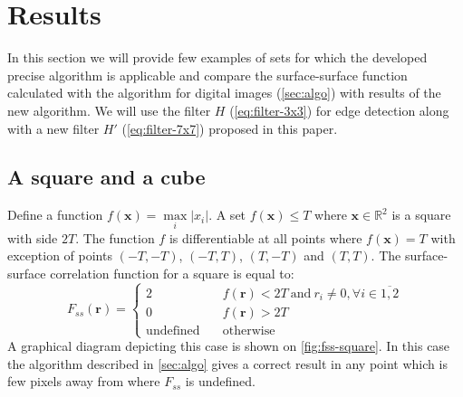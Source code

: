 \documentclass[reprint,amsmath,amssymb,aps,pre,showkeys,showpacs]{revtex4-1}
\begin{document}
\section{Results}
\label{sec:results}
In this section we will provide few examples of sets for which the developed
precise algorithm is applicable and compare the surface-surface function
calculated with the algorithm for digital images (\cref{sec:algo}) with results
of the new algorithm. We will use the filter $H$ (\ref{eq:filter-3x3}) for edge
detection along with a new filter $H'$ (\ref{eq:filter-7x7}) proposed in this
paper.

\subsection{A square and a cube}
Define a function $f(\bm{x}) = \max\limits_i |x_i|$. A set $f(\bm{x}) \le T$
where $\bm{x} \in \mathbb{R}^2$ is a square with side $2T$. The function $f$ is
differentiable at all points where $f(\bm{x}) = T$ with exception of points
$(-T, -T)$, $(-T, T)$, $(T, -T)$ and $(T, T)$. The surface-surface correlation
function for a square is equal to:
\begin{equation*}
  F_{ss}(\bm{r}) = \left\{
  \begin{array}{ll}
    2 & \quad f(\bm{r}) < 2T \ \text{and}\ r_i \ne 0, \forall i \in \overline{1,2} \\
    0 & \quad f(\bm{r}) > 2T \\
    \text{undefined} & \quad \text{otherwise}
  \end{array}
  \right.
\end{equation*}
A graphical diagram depicting this case is shown on \cref{fig:fss-square}. In
this case the algorithm described in \cref{sec:algo} gives a correct result in
any point which is few pixels away from where $F_{ss}$ is undefined.
\end{document}
